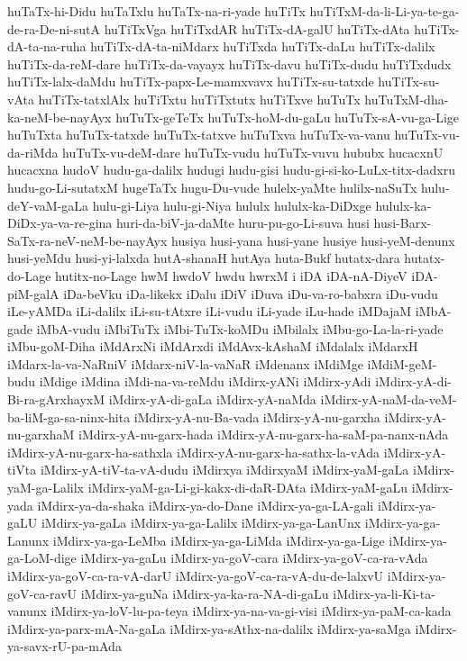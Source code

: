 {huTaTx-hi-Didu
huTaTxlu
huTaTx-na-ri-yade
huTiTx
huTiTxM-da-li-Li-ya-te-ga-de-ra-De-ni-sutA
huTiTxVga
huTiTxdAR
huTiTx-dA-galU
huTiTx-dAta
huTiTx-dA-ta-na-ruha
huTiTx-dA-ta-niMdarx
huTiTxda
huTiTx-daLu
huTiTx-dalilx
huTiTx-da-reM-dare
huTiTx-da-vayayx
huTiTx-davu
huTiTx-dudu
huTiTxdudx
huTiTx-lalx-daMdu
huTiTx-papx-Le-mamxvavx
huTiTx-su-tatxde
huTiTx-su-vAta
huTiTx-tatxlAlx
huTiTxtu
huTiTxtutx
huTiTxve
huTuTx
huTuTxM-dha-ka-neM-be-nayAyx
huTuTx-geTeTx
huTuTx-hoM-du-gaLu
huTuTx-sA-vu-ga-Lige
huTuTxta
huTuTx-tatxde
huTuTx-tatxve
huTuTxva
huTuTx-va-vanu
huTuTx-vu-da-riMda
huTuTx-vu-deM-dare
huTuTx-vudu
huTuTx-vuvu
hububx
hucacxnU
hucacxna
hudoV
hudu-ga-dalilx
hudugi
hudu-gisi
hudu-gi-si-ko-LuLx-titx-dadxru
hudu-go-Li-sutatxM
hugeTaTx
hugu-Du-vude
hulelx-yaMte
hulilx-naSuTx
hulu-deY-vaM-gaLa
hulu-gi-Liya
hulu-gi-Niya
hululx
hululx-ka-DiDxge
hululx-ka-DiDx-ya-va-re-gina
huri-da-biV-ja-daMte
huru-pu-go-Li-suva
husi
husi-Barx-SaTx-ra-neV-neM-be-nayAyx
husiya
husi-yana
husi-yane
husiye
husi-yeM-denunx
husi-yeMdu
husi-yi-lalxda
hutA-shanaH
hutAya
huta-Bukf
hutatx-dara
hutatx-do-Lage
hutitx-no-Lage
hwM
hwdoV
hwdu
hwrxM
i
iDA
iDA-nA-DiyeV
iDA-piM-galA
iDa-beVku
iDa-likekx
iDalu
iDiV
iDuva
iDu-va-ro-babxra
iDu-vudu
iLe-yAMDa
iLi-dalilx
iLi-su-tAtxre
iLi-vudu
iLi-yade
iLu-hade
iMDajaM
iMbA-gade
iMbA-vudu
iMbiTuTx
iMbi-TuTx-koMDu
iMbilalx
iMbu-go-La-la-ri-yade
iMbu-goM-Diha
iMdArxNi
iMdArxdi
iMdAvx-kAshaM
iMdalalx
iMdarxH
iMdarx-la-va-NaRniV
iMdarx-niV-la-vaNaR
iMdenanx
iMdiMge
iMdiM-geM-budu
iMdige
iMdina
iMdi-na-va-reMdu
iMdirx-yANi
iMdirx-yAdi
iMdirx-yA-di-Bi-ra-gArxhayxM
iMdirx-yA-di-gaLa
iMdirx-yA-naMda
iMdirx-yA-naM-da-veM-ba-liM-ga-sa-ninx-hita
iMdirx-yA-nu-Ba-vada
iMdirx-yA-nu-garxha
iMdirx-yA-nu-garxhaM
iMdirx-yA-nu-garx-hada
iMdirx-yA-nu-garx-ha-saM-pa-nanx-nAda
iMdirx-yA-nu-garx-ha-sathxla
iMdirx-yA-nu-garx-ha-sathx-la-vAda
iMdirx-yA-tiVta
iMdirx-yA-tiV-ta-vA-dudu
iMdirxya
iMdirxyaM
iMdirx-yaM-gaLa
iMdirx-yaM-ga-Lalilx
iMdirx-yaM-ga-Li-gi-kakx-di-daR-DAta
iMdirx-yaM-gaLu
iMdirx-yada
iMdirx-ya-da-shaka
iMdirx-ya-do-Dane
iMdirx-ya-ga-LA-gali
iMdirx-ya-gaLU
iMdirx-ya-gaLa
iMdirx-ya-ga-Lalilx
iMdirx-ya-ga-LanUnx
iMdirx-ya-ga-Lanunx
iMdirx-ya-ga-LeMba
iMdirx-ya-ga-LiMda
iMdirx-ya-ga-Lige
iMdirx-ya-ga-LoM-dige
iMdirx-ya-gaLu
iMdirx-ya-goV-cara
iMdirx-ya-goV-ca-ra-vAda
iMdirx-ya-goV-ca-ra-vA-darU
iMdirx-ya-goV-ca-ra-vA-du-de-lalxvU
iMdirx-ya-goV-ca-ravU
iMdirx-ya-guNa
iMdirx-ya-ka-ra-NA-di-gaLu
iMdirx-ya-li-Ki-ta-vanunx
iMdirx-ya-loV-lu-pa-teya
iMdirx-ya-na-va-gi-visi
iMdirx-ya-paM-ca-kada
iMdirx-ya-parx-mA-Na-gaLa
iMdirx-ya-sAthx-na-dalilx
iMdirx-ya-saMga
iMdirx-ya-savx-rU-pa-mAda
}

